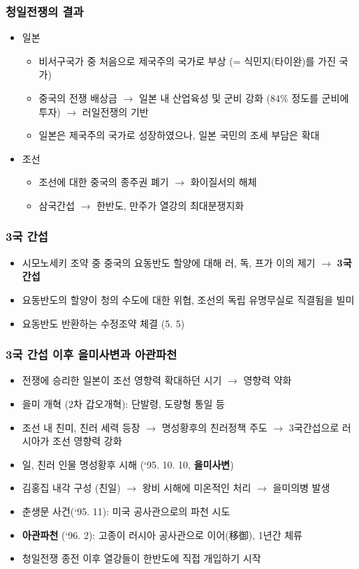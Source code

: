 \subsubsection*{청일전쟁의 결과}
\begin{itemize}
\item 일본
\begin{itemize}
    \item 비서구국가 중 처음으로 제국주의 국가로 부상 (= 식민지(타이완)를 가진 국가)
    \item 중국의 전쟁 배상금 $\rightarrow$ 일본 내 산업육성 및 군비 강화 (84\% 정도를 군비에 투자) $\rightarrow$ 러일전쟁의 기반
    \item 일본은 제국주의 국가로 성장하였으나, 일본 국민의 조세 부담은 확대
\end{itemize}
\item 조선
    \begin{itemize}
    \item 조선에 대한 중국의 종주권 폐기 $\rightarrow$ 화이질서의 해체
    \item 삼국간섭 $\rightarrow$ 한반도, 만주가 열강의 최대분쟁지화
    \end{itemize}
\end{itemize}

\subsubsection*{3국 간섭}
\begin{itemize}
    \item 시모노세키 조약 중 중국의 요동반도 할양에 대해 러, 독, 프가 이의 제기 $\rightarrow$ \textbf{3국 간섭}
    \item 요동반도의 할양이 청의 수도에 대한 위협, 조선의 독립 유명무실로 직결됨을 빌미
    \item 요동반도 반환하는 수정조약 체결 (5. 5)
\end{itemize}
\newpage

\subsubsection*{3국 간섭 이후 을미사변과 아관파천}
\begin{itemize}
    \item 전쟁에 승리한 일본이 조선 영향력 확대하던 시기 $\rightarrow$ 영향력 약화
    \item 을미 개혁 (2차 갑오개혁): 단발령, 도량형 통일 등
    \item 조선 내 친미, 친러 세력 등장 $\rightarrow$ 명성황후의 친러정책 주도 $\rightarrow$ 3국간섭으로 러시아가 조선 영향력 강화
    \item 일, 친러 인물 명성황후 시해 (`95. 10. 10, \textbf{을미사변})
    \item 김홍집 내각 구성 (친일) $\rightarrow$ 왕비 시해에 미온적인 처리 $\rightarrow$ 을미의병 발생
    \item 춘생문 사건(`95. 11): 미국 공사관으로의 파천 시도
    \item \textbf{아관파천} (`96. 2): 고종이 러시아 공사관으로 이어(移御), 1년간 체류
    \item 청일전쟁 종전 이후 열강들이 한반도에 직접 개입하기 시작
\end{itemize}
